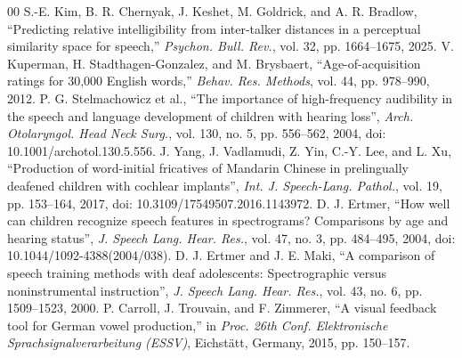 \documentclass[conference]{IEEEtran}
\begin{document}
\begin{thebibliography}{00}
 S.-E. Kim, B. R. Chernyak, J. Keshet, M. Goldrick, and A. R. Bradlow, ``Predicting relative intelligibility from inter-talker distances in a perceptual similarity space for speech,'' \textit{Psychon. Bull. Rev.}, vol. 32, pp. 1664--1675, 2025.
 V. Kuperman, H. Stadthagen-Gonzalez, and M. Brysbaert, ``Age-of-acquisition ratings for 30,000 English words,'' \textit{Behav. Res. Methods}, vol. 44, pp. 978--990, 2012.
 P. G. Stelmachowicz et al., ``The importance of high-frequency audibility in the speech and language development of children with hearing loss'', \textit{Arch. Otolaryngol. Head Neck Surg.}, vol. 130, no. 5, pp. 556--562, 2004, doi: 10.1001/archotol.130.5.556.
 J. Yang, J. Vadlamudi, Z. Yin, C.-Y. Lee, and L. Xu, ``Production of word-initial fricatives of Mandarin Chinese in prelingually deafened children with cochlear implants'', \textit{Int. J. Speech-Lang. Pathol.}, vol. 19, pp. 153--164, 2017, doi: 10.3109/17549507.2016.1143972.
 D. J. Ertmer, ``How well can children recognize speech features in spectrograms? Comparisons by age and hearing status'', \textit{J. Speech Lang. Hear. Res.}, vol. 47, no. 3, pp. 484--495, 2004, doi: 10.1044/1092-4388(2004/038).
 D. J. Ertmer and J. E. Maki, ``A comparison of speech training methods with deaf adolescents: Spectrographic versus noninstrumental instruction'', \textit{J. Speech Lang. Hear. Res.}, vol. 43, no. 6, pp. 1509--1523, 2000.
P. Carroll, J. Trouvain, and F. Zimmerer,
``A visual feedback tool for German vowel production,''
in \emph{Proc. 26th Conf. Elektronische Sprachsignalverarbeitung
(ESSV)}, Eichst{\"a}tt, Germany, 2015, pp. 150--157.
\end{thebibliography}
\end{document}
